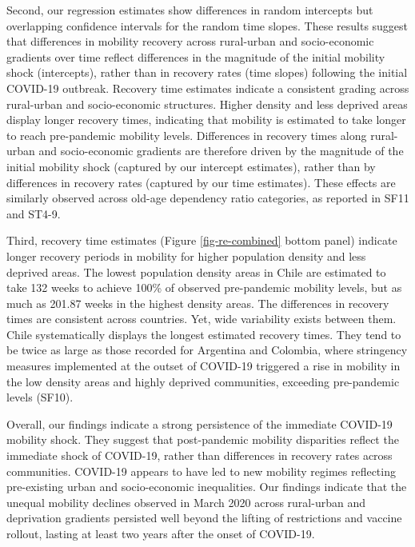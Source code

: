 \documentclass[fleqn,10pt]{wlscirep}
\begin{document}
Second, our regression estimates show differences in random intercepts but overlapping confidence intervals for the random time slopes. These results suggest that differences in mobility recovery across rural-urban and socio-economic gradients over time reflect differences in the magnitude of the initial mobility shock (intercepts), rather than in recovery rates (time slopes) following the initial COVID-19 outbreak. Recovery time estimates indicate a consistent grading across rural-urban and socio-economic structures. Higher density and less deprived areas display longer recovery times, indicating that mobility is estimated to take longer to reach pre-pandemic mobility levels. Differences in recovery times along rural-urban and socio-economic gradients are therefore driven by the magnitude of the initial mobility shock (captured by our intercept estimates), rather than by differences in recovery rates (captured by our time estimates). These effects are similarly observed across old-age dependency ratio categories, as reported in SF11 and ST4-9.

Third, recovery time estimates (Figure \ref{fig-re-combined} bottom panel) indicate longer recovery periods in mobility for higher population density and less deprived areas. The lowest population density areas in Chile are estimated to take 132 weeks to achieve 100\% of observed pre-pandemic mobility levels, but as much as 201.87 weeks in the highest density areas. The differences in recovery times are consistent across countries. Yet, wide variability exists between them. Chile systematically displays the longest estimated recovery times. They tend to be twice as large as those recorded for Argentina and Colombia, where stringency measures implemented at the outset of COVID-19 triggered a rise in mobility in the low density areas and highly deprived communities, exceeding pre-pandemic levels (SF10).

Overall, our findings indicate a strong persistence of the immediate COVID-19 mobility shock. They suggest that post-pandemic mobility disparities reflect the immediate shock of COVID-19, rather than differences in recovery rates across communities. COVID-19 appears to have led to new mobility regimes reflecting pre-existing urban and socio-economic inequalities. Our findings indicate that the unequal mobility declines observed in March 2020 across rural-urban and deprivation gradients persisted well beyond the lifting of restrictions and vaccine rollout, lasting at least two years after the onset of COVID-19.
\end{document}
